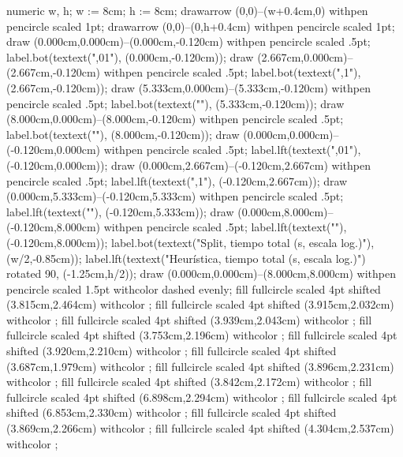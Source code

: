 {\startMPcode
numeric w, h; w := 8cm; h := 8cm;
drawarrow (0,0)--(w+0.4cm,0) withpen pencircle scaled 1pt;
drawarrow (0,0)--(0,h+0.4cm) withpen pencircle scaled 1pt;
draw (0.000cm,0.000cm)--(0.000cm,-0.120cm) withpen pencircle scaled .5pt;
label.bot(textext(",01"), (0.000cm,-0.120cm));
draw (2.667cm,0.000cm)--(2.667cm,-0.120cm) withpen pencircle scaled .5pt;
label.bot(textext(",1"), (2.667cm,-0.120cm));
draw (5.333cm,0.000cm)--(5.333cm,-0.120cm) withpen pencircle scaled .5pt;
label.bot(textext(""), (5.333cm,-0.120cm));
draw (8.000cm,0.000cm)--(8.000cm,-0.120cm) withpen pencircle scaled .5pt;
label.bot(textext(""), (8.000cm,-0.120cm));
draw (0.000cm,0.000cm)--(-0.120cm,0.000cm) withpen pencircle scaled .5pt;
label.lft(textext(",01"), (-0.120cm,0.000cm));
draw (0.000cm,2.667cm)--(-0.120cm,2.667cm) withpen pencircle scaled .5pt;
label.lft(textext(",1"), (-0.120cm,2.667cm));
draw (0.000cm,5.333cm)--(-0.120cm,5.333cm) withpen pencircle scaled .5pt;
label.lft(textext(""), (-0.120cm,5.333cm));
draw (0.000cm,8.000cm)--(-0.120cm,8.000cm) withpen pencircle scaled .5pt;
label.lft(textext(""), (-0.120cm,8.000cm));
label.bot(textext("Split, tiempo total (s, escala log.)"), (w/2,-0.85cm));
label.lft(textext("Heurística, tiempo total (s, escala log.)") rotated 90, (-1.25cm,h/2));
draw (0.000cm,0.000cm)--(8.000cm,8.000cm) withpen pencircle scaled 1.5pt withcolor  dashed evenly;
fill fullcircle scaled 4pt shifted (3.815cm,2.464cm) withcolor ;
fill fullcircle scaled 4pt shifted (3.915cm,2.032cm) withcolor ;
fill fullcircle scaled 4pt shifted (3.939cm,2.043cm) withcolor ;
fill fullcircle scaled 4pt shifted (3.753cm,2.196cm) withcolor ;
fill fullcircle scaled 4pt shifted (3.920cm,2.210cm) withcolor ;
fill fullcircle scaled 4pt shifted (3.687cm,1.979cm) withcolor ;
fill fullcircle scaled 4pt shifted (3.896cm,2.231cm) withcolor ;
fill fullcircle scaled 4pt shifted (3.842cm,2.172cm) withcolor ;
fill fullcircle scaled 4pt shifted (6.898cm,2.294cm) withcolor ;
fill fullcircle scaled 4pt shifted (6.853cm,2.330cm) withcolor ;
fill fullcircle scaled 4pt shifted (3.869cm,2.266cm) withcolor ;
fill fullcircle scaled 4pt shifted (4.304cm,2.537cm) withcolor ;
}
